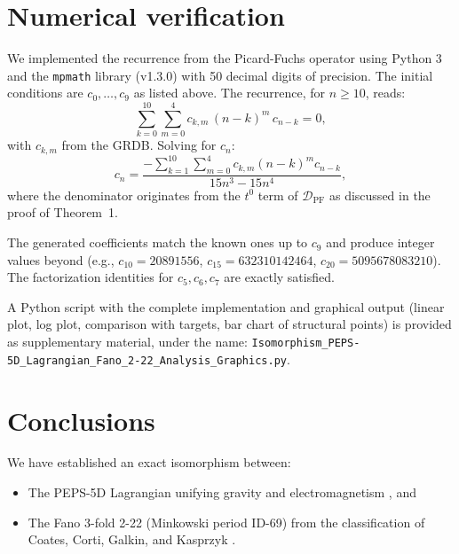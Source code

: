 \documentclass[12pt]{article}
\begin{document}
\section{Numerical verification}

We implemented the recurrence from the Picard-Fuchs operator using Python 3
and the \texttt{mpmath} library (v1.3.0) with 50 decimal digits of precision.
The initial conditions are $c_0,\dots,c_9$ as listed above. The recurrence,
for $n \ge 10$, reads:
\[
\sum_{k=0}^{10} \sum_{m=0}^{4} c_{k,m} \, (n-k)^m \, c_{n-k} = 0,
\]
with $c_{k,m}$ from the GRDB. Solving for $c_n$:
\begin{equation}
c_n = \frac{-\sum_{k=1}^{10} \sum_{m=0}^{4} c_{k,m} (n-k)^m c_{n-k}}{15n^3 - 15n^4} ,
\label{eq:solution}
\end{equation}
where the denominator originates from the $t^0$ term of $\mathcal{D}_{\text{PF}}$
as discussed in the proof of Theorem~1.

The generated coefficients match the known ones up to $c_9$ and produce
integer values beyond (e.g., $c_{10}=20891556$, $c_{15}=632310142464$,
$c_{20}=5095678083210$). The factorization identities for $c_5, c_6, c_7$
are exactly satisfied.

A Python script with the complete implementation and graphical output
(linear plot, log plot, comparison with targets, bar chart of structural
points) is provided as supplementary material, under the name:
\texttt{Isomorphism\_PEPS-5D\_Lagrangian\_Fano\_2-22\_Analysis\_Graphics.py}.

\section{Conclusions}

We have established an exact isomorphism between:

\begin{itemize}
  \item The PEPS-5D Lagrangian unifying gravity and electromagnetism
        \cite{peps5d}, and
  \item The Fano 3-fold 2-22 (Minkowski period ID-69) from the classification
        of Coates, Corti, Galkin, and Kasprzyk \cite{coates2013}.
\end{itemize}
\end{document}
